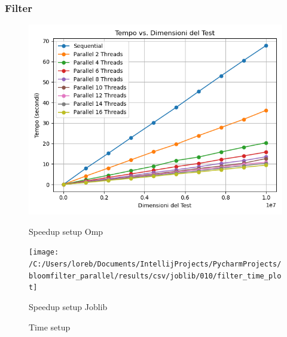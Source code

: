 \documentclass[11pt]{article}
\begin{document}
    \subsubsection{Filter}\label{subsubsec:fpr-010-filter}
    \begin{figure}[H]
        \centering
        \includegraphics[width=\linewidth]{omp/010/filter_time_plot}
            \caption{Speedup setup Omp}\label{fig:010-filter_time_omp}
        \endminipage\hfill
        \texttt{[image: /C:/Users/loreb/Documents/IntellijProjects/PycharmProjects/bloomfilter\_parallel/results/csv/joblib/010/filter\_time\_plot]}
            \caption{Speedup setup Joblib}\label{fig:010-filter_time_joblib}
        \endminipage\hfill
        \caption{Time setup}
    \end{figure}
\end{document}
